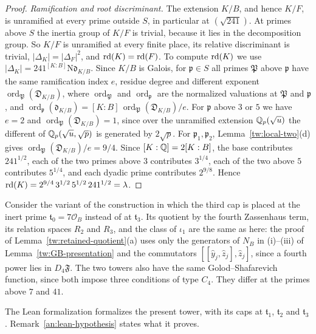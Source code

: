 \begin{proof}
\emph{Ramification and root discriminant.} The extension $K/B$, and hence
$K/F$, is unramified at every prime outside $S$, in particular at
$(\sqrt{241})$. At primes above $S$ the inertia group of $K/F$ is trivial,
because it lies in the decomposition group. So $K/F$ is unramified at every
finite place, its relative discriminant is trivial, $|\Delta_K|=|\Delta_F|^2$,
and $\operatorname{rd}(K)=\operatorname{rd}(F)$. To compute $\operatorname{rd}(K)$ we use
$|\Delta_K|=241^{[K:B]}\mathrm N\mathfrak d_{K/B}$. Since $K/B$ is Galois, for
$\mathfrak p\in S$ all primes $\mathfrak P$ above $\mathfrak p$ have the same
ramification index $e$, residue degree and different exponent
$\operatorname{ord}_{\mathfrak P}(\mathfrak D_{K/B})$, where
$\operatorname{ord}_{\mathfrak P}$ and $\operatorname{ord}_{\mathfrak p}$ are
the normalized valuations at $\mathfrak P$ and $\mathfrak p$, and
$\operatorname{ord}_{\mathfrak p}(\mathfrak d_{K/B})=[K:B]\,\operatorname{ord}_{\mathfrak P}(\mathfrak D_{K/B})/e$.
For $\mathfrak p$ above $3$ or $5$ we have $e=2$ and
$\operatorname{ord}_{\mathfrak P}(\mathfrak D_{K/B})=1$, since over the unramified extension
$\mathbb Q_p(\sqrt u)$ the different of $\mathbb Q_p(\sqrt u,\sqrt p)$ is generated by
$2\sqrt p$. For $\mathfrak p_1,\mathfrak p_2$, Lemma~\ref{tw:local-two}(d)
gives $\operatorname{ord}_{\mathfrak P}(\mathfrak D_{K/B})/e=9/4$. Since $[K:\mathbb Q]=2[K:B]$, the
base contributes $241^{1/2}$, each of the two primes above $3$ contributes
$3^{1/4}$, each of the two above $5$ contributes $5^{1/4}$, and each dyadic
prime contributes $2^{9/8}$. Hence
$\operatorname{rd}(K)=2^{9/4}\,3^{1/2}\,5^{1/2}\,241^{1/2}=\lambda$.
\end{proof}

\begin{remark}\label{tw:same-quotient}
Consider the variant of the construction in which the third cap is placed at
the inert prime $\mathfrak t_0=7\mathcal O_B$ instead of at $\mathfrak t_3$.
Its quotient by the fourth Zassenhaus term, its relation spaces $R_2$ and
$R_3$, and the class of $\iota_1$ are the same as here: the proof of
Lemma~\ref{tw:retained-quotient}(a) uses only the generators of $N_B$ in
(i)--(iii) of Lemma~\ref{tw:GB-presentation} and the commutators
$[[\hat y_j,\hat z_j],\hat z_j]$, since a fourth power lies in $D_4\mathfrak F$.
The two towers also have the same Golod--Shafarevich function, since both
impose three conditions of type $C_4$. They differ at the primes above
$7$ and $41$.
\end{remark}

\begin{remark}\label{tw:lean-remark}
The Lean formalization \cite{NaslundLeanW} formalizes the present tower,
with its caps at $\mathfrak t_1$, $\mathfrak t_2$ and $\mathfrak t_3$.
Remark~\ref{an:lean-hypothesis} states what it proves.
\end{remark}
